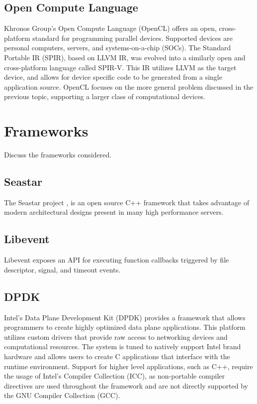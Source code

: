 \subsection{Open Compute Language}
\label{related:hcp:ocl}
Khronos Group's Open Compute Language (OpenCL) \cite{opencl} offers an open,
cross-platform standard for programming parallel devices. Supported devices are
personal computers, servers, and systems-on-a-chip (SOCs). The Standard
Portable IR (SPIR), based on LLVM IR, was evolved into a similarly open and
cross-platform language called SPIR-V. This IR utilizes LLVM as the target
device, and allows for device specific code to be generated from a single
application source. OpenCL focuses on the more general problem discussed in
the previous topic, supporting a larger class of computational devices.

\section{Frameworks}
\label{related:frameworks}
Discuss the frameworks considered.

\subsection{Seastar}
\label{related:frameworks:seastar}
The Seastar project \cite{seastar}, is an open source C++ framework that
takes advantage of modern architectural designs present in many high
performance servers.

\subsection{Libevent}
\label{related:frameworks:libevent}
Libevent \cite{libevent} exposes an API for executing function callbacks
triggered by file descriptor, signal, and timeout events.

\subsection{DPDK}
\label{related:frameworks:dpdk}
Intel's Data Plane Development Kit (DPDK) \cite{dpdk} provides a framework that
allows programmers to create highly optimized data plane applications. This
platform utilizes custom drivers that provide raw access to networking devices
and computational resources. The system is tuned to natively support Intel
brand hardware and allows users to create C applications that interface with
the runtime environment. Support for higher level applications, such as C++,
require the usage of Intel's Compiler Collection (ICC), as non-portable
compiler directives are used throughout the framework and are not directly
supported by the GNU Compiler Collection (GCC).

